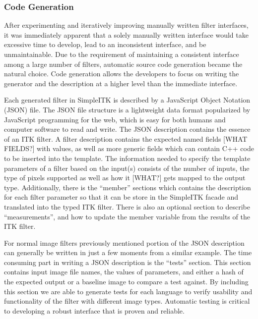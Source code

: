 \documentclass{frontiersMED} %
\begin{document}
\subsubsection{Code Generation}
After experimenting and iteratively improving manually written filter
interfaces, it was immediately apparent that a solely manually written
interface would take excessive time to develop, lead to an
inconsistent interface, and be unmaintainable. Due to the requirement
of maintaining a consistent interface among a large number of filters,
automatic source code generation became the natural choice. Code
generation allows the developers to focus on writing the generator and
the description at a higher level than the immediate interface.

Each generated filter in SimpleITK is described by a JavaScript Object
Notation (JSON) file. The JSON file structure is a lightweight data
format popularized by JavaScript programming for the web, which is
easy for both humans and computer software to read and write. The JSON
description contains the essence of an ITK filter. A filter
description contains the expected named fields [WHAT FIELDS?] with
values, as well as more generic fields which can contain C++ code to
be inserted into the template. The information needed to specify the
template parameters of a filter based on the input(s) consists of the
number of inputs, the type of pixels supported as well as how it
[WHAT?] gets mapped to the output type. Additionally, there is the
“member” sections which contains the description for each filter
parameter so that it can be store in the SimpleITK facade and
translated into the typed ITK filter. There is also an optional
section to describe “measurements”, and how to update the member
variable from the results of the ITK filter.

For normal image filters previously mentioned portion of the JSON
description can generally be written in just a few moments from a
similar example. The time consuming part in writing a JSON description
is the “tests” section. This section contains input image file names,
the values of parameters, and either a hash of the expected output or
a baseline image to compare a test against. By including this section
we are able to generate tests for each language to verify usability
and functionality of the filter with different image types. Automatic
testing is critical to developing a robust interface that is proven
and reliable.
\end{document}
